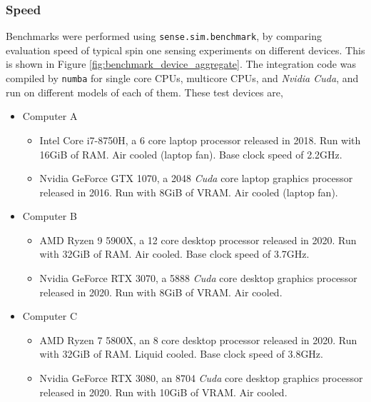 \documentclass{jors}
\begin{document}
		\subsubsection*{Speed}
			Benchmarks were performed using \texttt{sense.sim.benchmark}, by comparing evaluation speed of typical spin one sensing experiments on different devices. This is shown in Figure \ref{fig:benchmark_device_aggregate}. The integration code was compiled by \texttt{numba} for single core CPUs, multicore CPUs, and \emph{Nvidia Cuda}, and run on different models of each of them. These test devices are,
			\begin{itemize}
				\item{
					Computer A\begin{itemize}
						\item Intel Core i7-8750H, a 6 core laptop processor released in 2018. Run with 16GiB of RAM. Air cooled (laptop fan). Base clock speed of 2.2GHz.
						\item Nvidia GeForce GTX 1070, a 2048 \emph{Cuda} core laptop graphics processor released in 2016. Run with 8GiB of VRAM. Air cooled (laptop fan).
					\end{itemize}
				}

				\item{Computer B\begin{itemize}
						\item AMD Ryzen 9 5900X, a 12 core desktop processor released in 2020. Run with 32GiB of RAM. Air cooled. Base clock speed of 3.7GHz.
						\item Nvidia GeForce RTX 3070, a 5888 \emph{Cuda} core desktop graphics processor released in 2020. Run with 8GiB of VRAM. Air cooled.
					\end{itemize}
				}

				\item{Computer C\begin{itemize}
						\item AMD Ryzen 7 5800X, an 8 core desktop processor released in 2020. Run with 32GiB of RAM. Liquid cooled. Base clock speed of 3.8GHz.
						\item Nvidia GeForce RTX 3080, an 8704 \emph{Cuda} core desktop graphics processor released in 2020. Run with 10GiB of VRAM. Air cooled.
					\end{itemize}
				}
			\end{itemize}
\end{document}
